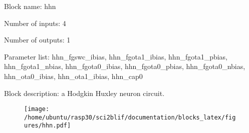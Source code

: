 \pagebreak

Block name: hhn

Number of inputs: 4

Number of outputs: 1

Parameter list: hhn\_fgswc\_ibias, hhn\_fgota1\_ibias, hhn\_fgota1\_pbias, hhn\_fgota1\_nbias, hhn\_fgota0\_ibias, hhn\_fgota0\_pbias, hhn\_fgota0\_nbias, hhn\_ota0\_ibias, hhn\_ota1\_ibias, hhn\_cap0

Block description: 
a Hodgkin Huxley neuron circuit. 

\begin{figure}[H]  %
\texttt{[image: /home/ubuntu/rasp30/sci2blif/documentation/blocks\_latex/figures/hhn.pdf]}
\end{figure}

